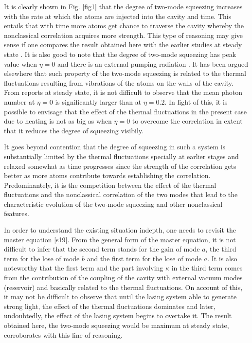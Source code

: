 \documentclass[twocolumn,showpacs,preprintnumbers,amsmath,amssymb,pra]{revtex4}
\begin{document}
It is clearly shown in Fig. \ref{fig1} that the degree of two-mode squeezing increases with the rate at which the atoms are injected into the cavity and time. This entails that with time more atoms get chance to traverse the cavity whereby the nonclassical correlation  acquires more strength. This type of reasoning may give sense if one compares the result obtained here with the earlier studies at steady state \cite{pra74043816}. It is also good to note that the degree of two-mode squeezing has peak value when $\eta=0$ and there is an external pumping radiation \cite{sint}. It has been argued elsewhere that such property of the two-mode squeezing is related to the thermal fluctuations resulting from vibrations of the atoms on the walls of the cavity. From reports at steady state, it is not difficult to observe that the mean photon number at $\eta=0$ is significantly larger than at $\eta=0.2$. In light of this, it is possible to envisage that the effect of the thermal fluctuations in the present case due to heating is not as big as when $\eta=0$ to overcome the correlation in extent that it reduces the degree of squeezing visibily. 

It goes beyond contention that the degree of squeezing in such a system is substantially limited by the thermal fluctuations specially at earlier stages and relaxed somewhat as time progresses since the strength of the correlation gets better as more atoms contribute towards establishing the correlation. Predominantely, it is the competition between the effect of the thermal fluctuations and the nonclassical correlation of the two modes that lead to the characteristic evolution of the two-mode squeezing and other nonclassical features. 

In order to understand the existing situation indepth, one needs to revisit the master equation \eqref{s19}. From the general form of the master equation, it is not difficult to infer that the second term stands for the gain of mode $a$, the third term for the lose of mode $b$ and the first term for the lose of mode $a$. It is also noteworthy that the first term and the part involving $\kappa$ in the third term comes from the contribution of the coupling of the cavity with external vacuum modes (reservoir) and basically related to the thermal fluctuations. On account of this, it may not be difficult to observe that until the lasing system able to generate strong light, the effect of the thermal fluctuations dominates and later, undoubtedly, the effect of the lasing system begins to overtake it. The result obtained here, the two-mode squeezing would be maximum at steady state, corroborates with this line of reasoning. 
\end{document}
